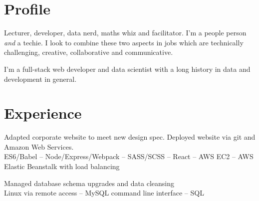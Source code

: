 \documentclass[a4paper,nomath]{deedy-resume} %
\begin{document}

\lastupdated %


%
\begin{paracol}{2} %


    \section{Profile}
    \flushleft
    Lecturer, developer, data nerd, maths whiz and facilitator.
	I'm a people person \textit{and} a techie. I look to combine these two aspects in jobs which are technically challenging, creative, collaborative and communicative.

	\vspace{\topsep}

	I'm a full-stack web developer and data scientist with a long history in data and development in general.
	

    \section{Experience}

	
	\vspace{\topsep} %
	\begin{tightitemize}
		\item Adapted corporate website to meet new design spec. Deployed website via git and Amazon Web Services.
		\\
		ES6/Babel -- Node/Express/Webpack -- SASS/SCSS -- React -- AWS EC2 -- AWS Elastic Beanstalk with load balancing
		\\
		\item Managed database schema upgrades and data cleansing\\
		Linux via remote access -- MySQL command line interface -- SQL
		

\end{tightitemize}
\end{paracol}
\end{document}
